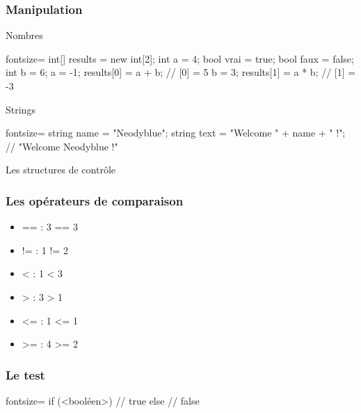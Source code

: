 \begin{frame}[fragile]
  \frametitle{Manipulation}

  \begin{center}{\large Nombres}\end{center}
  \begin{csharpcode*}{fontsize=\scriptsize}
    int[] results = new int[2];
    int a = 4;
    bool vrai = true;
    bool faux = false;
    int b = 6;
    a = -1;
    results[0] = a + b; // [0] = 5
    b = 3;
    results[1] = a * b; // [1] = -3
  \end{csharpcode*}

  \pause

  \begin{center}{\large Strings}\end{center}
  \begin{csharpcode*}{fontsize=\scriptsize}
    string name = "Neodyblue";
    string text = "Welcome " + name + " !"; // "Welcome Neodyblue !"
  \end{csharpcode*}
\end{frame}

\begin{frame}
  \begin{center}
    \vspace{1cm}
    Les structures de contrôle
  \end{center}
\end{frame}

\begin{frame}[fragile]
  \frametitle{Les opérateurs de comparaison}

  \begin{itemize}
    \item<+-> == : 3 == 3
    \item<+-> != : 1 != 2
    \item<+-> < : 1 < 3
    \item<+-> > : 3 > 1
    \item<+-> <= : 1 <= 1
    \item<+-> >= : 4 >= 2
  \end{itemize}
\end{frame}

\begin{frame}[fragile]
  \frametitle{Le test}

  \begin{csharpcode*}{fontsize=\scriptsize}
    if (<booléen>)
    {
      // true
    }
    else
    {
      // false
    }
  \end{csharpcode*}
\end{frame}


